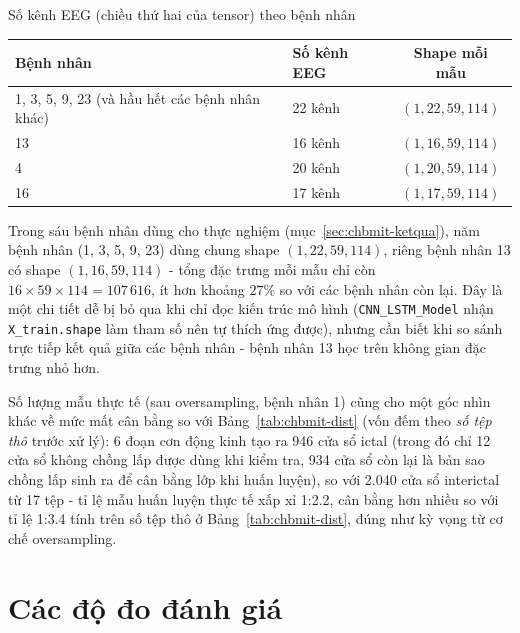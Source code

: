 \begin{table}[H]{Số kênh EEG (chiều thứ hai của tensor) theo bệnh nhân}
	\label{tab:chbmit-channels}
	\centering
	\begin{tabular}{llc}
		\toprule
		\textbf{Bệnh nhân} & \textbf{Số kênh EEG} & \textbf{Shape mỗi mẫu} \\
		\midrule
		1, 3, 5, 9, 23 (và hầu hết các bệnh nhân khác) & 22 kênh & $(1, 22, 59, 114)$ \\
		13 & 16 kênh\footnotemark & $(1, 16, 59, 114)$ \\
		4 & 20 kênh & $(1, 20, 59, 114)$ \\
		16 & 17 kênh & $(1, 17, 59, 114)$ \\
		\bottomrule
	\end{tabular}
\end{table}

Trong sáu bệnh nhân dùng cho thực nghiệm (mục~\ref{sec:chbmit-ketqua}), năm bệnh nhân (1, 3, 5,
9, 23) dùng chung shape $(1, 22, 59, 114)$, riêng bệnh nhân 13 có shape $(1, 16, 59, 114)$ -
tổng đặc trưng mỗi mẫu chỉ còn $16 \times 59 \times 114 = 107\,616$, ít hơn khoảng $27\%$ so với
các bệnh nhân còn lại. Đây là một chi tiết dễ bị bỏ qua khi chỉ đọc kiến trúc mô hình
(\texttt{CNN\_LSTM\_Model} nhận \texttt{X\_train.shape} làm tham số nên tự thích ứng được), nhưng
cần biết khi so sánh trực tiếp kết quả giữa các bệnh nhân - bệnh nhân 13 học trên không gian
đặc trưng nhỏ hơn.

Số lượng mẫu thực tế (sau oversampling, bệnh nhân 1) cũng cho một góc nhìn khác về mức mất cân
bằng so với Bảng~\ref{tab:chbmit-dist} (vốn đếm theo \textit{số tệp thô} trước xử lý): 6 đoạn cơn
động kinh tạo ra 946 cửa sổ ictal (trong đó chỉ 12 cửa sổ không chồng lấp được dùng khi kiểm tra,
934 cửa sổ còn lại là bản sao chồng lấp sinh ra để cân bằng lớp khi huấn luyện), so với 2.040 cửa
sổ interictal từ 17 tệp - tỉ lệ mẫu huấn luyện thực tế xấp xỉ 1:2.2, cân bằng hơn nhiều so với
tỉ lệ 1:3.4 tính trên số tệp thô ở Bảng~\ref{tab:chbmit-dist}, đúng như kỳ vọng từ cơ chế
oversampling.

\section{Các độ đo đánh giá}
\label{sec:metrics}

